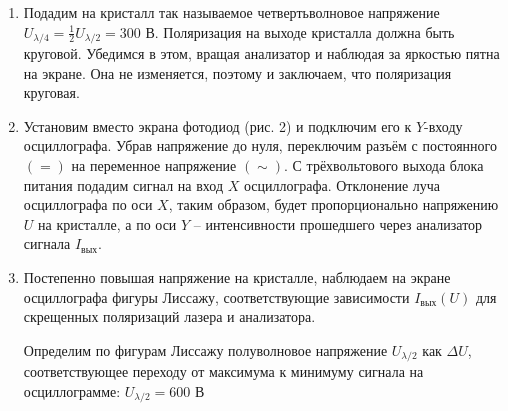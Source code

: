 \documentclass[12pt,a4paper]{article}
\begin{document}
\begin{enumerate}
		\circled{$\parallel$} $\hspace*{20mm} \boxed{U_{\lambda / 2} = (600 \pm 15) \text{ В}} \hspace*{30mm}  \boxed{U_{\lambda} = (1200 \pm 15) \text{ В}}$
		
		
		\item Подадим на кристалл так называемое четвертьволновое напряжение $U_{\lambda / 4} = \frac{1}{2} U_{\lambda / 2} = 300$ В. Поляризация на выходе кристалла должна быть круговой. Убедимся в этом, вращая анализатор и наблюдая за яркостью пятна на экране. Она не изменяется, поэтому и заключаем, что поляризация круговая.
		
		\item Установим вместо экрана фотодиод (рис. 2) и подключим его к $Y$-входу осциллографа. Убрав напряжение до нуля, переключим разъём с постоянного $(=)$ на переменное напряжение $(\sim)$. С трёхвольтового выхода блока питания подадим сигнал на вход $X$ осциллографа. Отклонение луча осциллографа по оси $X$, таким образом, будет пропорционально напряжению $U$ на кристалле, а по оси $Y$ -- интенсивности прошедшего через анализатор сигнала $I_{\text{вых}}$.
		
		
		\item Постепенно повышая напряжение на кристалле, наблюдаем на экране осциллографа фигуры Лиссажу, соответствующие зависимости $I_{\text{вых}}(U)$ для скрещенных поляризаций лазера и анализатора.
		
		Определим по фигурам Лиссажу полуволновое напряжение $U_{\lambda / 2}$ как $\Delta U$, соответствующее переходу от максимума к минимуму сигнала на осциллограмме: $\boxed{U_{\lambda / 2} = 600 \text{ В} }$
		

\end{enumerate}
\end{document}
